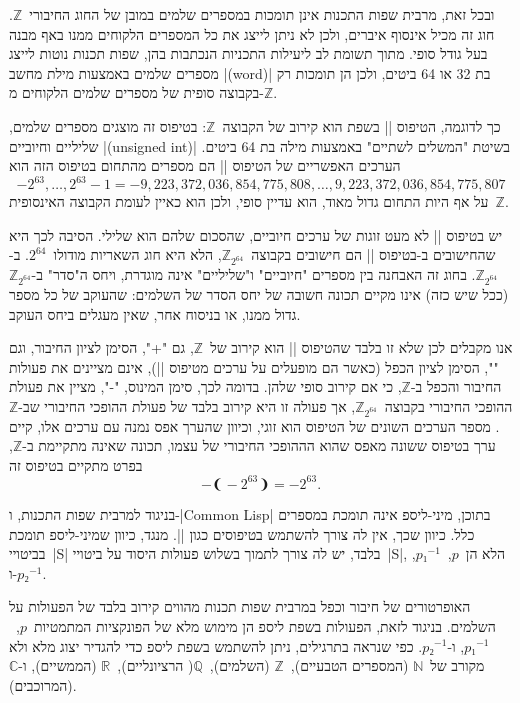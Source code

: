 ובכל זאת, מרבית שפות התכנות אינן תומכות במספרים שלמים במובן של החוג
החיבורי~$ℤ$. חוג זה מכיל אינסוף איברים, ולכן לא ניתן לייצג את כל המספרים
הלקוחים ממנו באף מבנה בעל גודל סופי. מתוך תשומת לב ליעילות התכניות הנכתבות בהן,
שפות תכנות נוטות לייצג מספרים שלמים באמצעות מילת מחשב \E|(word)| בת 32 או 64
ביטים, ולכן הן תומכות רק בקבוצה סופית של מספרים שלמים הלקוחים מ-$ℤ$.

כך לדוגמה, הטיפוס \E|| בשפת \Java הוא קירוב של הקבוצה~$ℤ$: בטיפוס זה מוצגים
מספרים שלמים, שליליים וחיוביים \E|(unsigned int)| בשיטת "המשלים לשתיים" באמצעות מילה בת
64 ביטים.
הערכים האפשריים של הטיפוס \E|| הם מספרים מהתחום
בטיפוס הזה הוא \begin{equation}
-2^{63},…,2^{63}-1=-9,223,372,036,854,775,808,…,9,223,372,036,854,775,807
\end{equation}
על אף היות התחום גדול מאוד, הוא עדיין סופי, ולכן הוא כאיין לעומת
הקבוצה האינסופית~$ℤ$.

יש בטיפוס \E|| לא מעט זוגות של ערכים חיוביים, שהסכום שלהם הוא שלילי.
הסיבה לכך היא שהחישובים ב-\Java בטיפוס \E|| הם חישובים
בקבוצה~$ℤ_{2^{64}}$, הלא היא חוג השאריות מודולו~$2^{64}$. ב-$ℤ_{2^{64}}$. בחוג
זה האבחנה בין מספרים "חיוביים" ו"שליליים" אינה מוגדרת, ויחס ה"סדר"
ב-$ℤ_{2^{64}}$ (ככל שיש כזה) אינו מקיים תכונה חשובה של יחס הסדר של השלמים:
שהעוקב של כל מספר גדול ממנו, או בניסוח אחר, שאין מעגלים ביחס העוקב.

אנו מקבלים לכן שלא זו בלבד שהטיפוס \E|| הוא קירוב של~$ℤ$, גם "\cc+",
הסימן לציון החיבור, וגם "\cc*", הסימן לציון הכפל \Java (כאשר הם
מופעלים על ערכים מטיפוס \E||), אינם מציינים את פעולות החיבור והכפל
ב-$ℤ$, כי אם קירוב סופי שלהן. בדומה לכך, סימן המינוס, "\cc-", מציין את פעולת
ההופכי החיבורי בקבוצה~$ℤ_{2^{64}}$, אך פעולה זו היא קירוב בלבד של פעולת ההופכי
החיבורי שב-$ℤ$. מספר הערכים השונים של הטיפוס  הוא זוגי, וכיוון
שהערך אפס נמנה עם ערכים אלו, קיים ערך בטיפוס ששונה מאפס שהוא הההופכי החיבורי של
עצמו,
תכונה שאינה מתקיימת ב-$ℤ$, בפרט מתקיים בטיפוס זה \begin{equation*}
-❨-2^{63}❩=-2^{63}.
\end{equation*}

בניגוד למרבית שפות התכנות, ו-\E|Common Lisp| בתוכן, מיני-ליספ אינה תומכת
במספרים כלל. כיוון שכך, אין לה צורך להשתמש בטיפוסים כגון \E||. מנגד,
כיוון שמיני-ליספ תומכת בביטויי~\E|S| בלבד, יש לה צורך לתמוך בשלוש פעולות היסוד
על ביטויי~\E|S|, הלא הן~$p$,~$p₁^{-1}$, ו-$p₂^{-1}$.

האופרטורים של חיבור וכפל במרבית שפות תכנות מהווים קירוב בלבד של הפעולות על
השלמים. בניגוד לזאת, הפעולות בשפת ליספ הן מימוש מלא של הפונקציות
המתמטיות~$p$,~$p₁^{-1}$, ו-$p₂^{-1}$. כפי שנראה בתרגילים, ניתן להשתמש בשפת
ליספ כדי להגדיר יצוג מלא ולא מקורב של~$ℕ$ (המספרים הטבעיים),~$ℤ$ (השלמים),~$ℚ$(
הרציונליים),~$ℝ$ (הממשיים), ו-$ℂ$ (המרוכבים).

